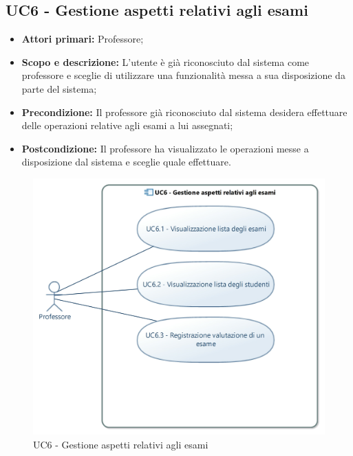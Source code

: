 \documentclass[AnalisiDeiRequisiti.tex]{subfiles}
\begin{document}
\subsection{UC6 - Gestione aspetti relativi agli esami}
\begin{itemize}
	\item \textbf{Attori primari:} Professore;\\
	\item \textbf{Scopo e descrizione:} L'utente è già riconosciuto dal sistema come professore e sceglie di utilizzare una funzionalità messa a sua disposizione da parte del sistema;\\
	\item \textbf{Precondizione:} Il professore già riconosciuto dal sistema desidera effettuare delle operazioni relative agli esami a lui assegnati;\\
	\item \textbf{Postcondizione:} Il professore ha visualizzato le operazioni messe a disposizione dal sistema e sceglie quale effettuare.\\
\end{itemize}

\begin{figure}[H]
	\centering
	\includegraphics[width=0.8\linewidth]{UC6.jpg}
	\caption{UC6 - Gestione aspetti relativi agli esami}
	\label{fig:UC6 - Gestione aspetti relativi agli esami}
\end{figure}
\end{document}
